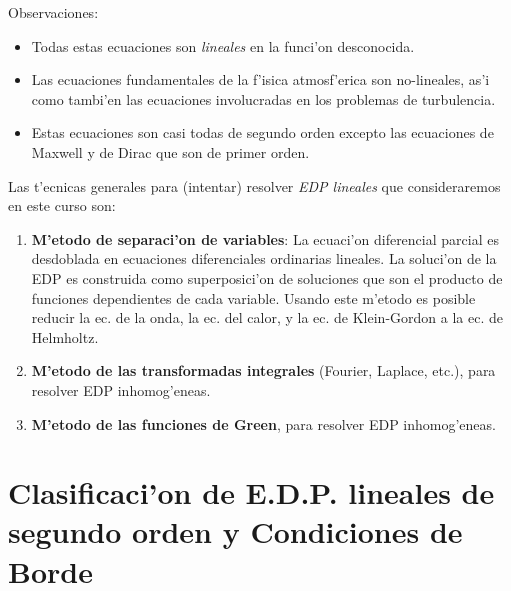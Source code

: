 Observaciones:

\begin{itemize}
\item Todas estas ecuaciones son \textit{lineales} en la funci'on desconocida.
\item Las ecuaciones fundamentales de la f'isica atmosf'erica son no-lineales, as'i como tambi'en las ecuaciones involucradas en los problemas de turbulencia.
\item Estas ecuaciones son casi todas de segundo orden excepto las ecuaciones de Maxwell y de Dirac que son de primer orden.
\end{itemize}

Las t'ecnicas generales para (intentar) resolver \textit{EDP lineales} que consideraremos en este curso son:
\begin{enumerate}
\item \textbf{M'etodo de separaci'on de variables}: La ecuaci'on diferencial parcial es desdoblada en ecuaciones diferenciales ordinarias lineales. La soluci'on de la EDP es construida como superposici'on de soluciones que son el producto de funciones dependientes de cada variable. Usando este m'etodo es posible reducir la ec. de la onda, la ec. del calor, y la ec. de Klein-Gordon a la ec. de Helmholtz.
\item \textbf{M'etodo de las transformadas integrales} (Fourier, Laplace, etc.), para resolver EDP inhomog'eneas.
\item \textbf{M'etodo de las funciones de Green}, para resolver EDP inhomog'eneas.

\end{enumerate}

\section{Clasificaci'on de E.D.P. lineales de segundo orden y Condiciones de Borde}

